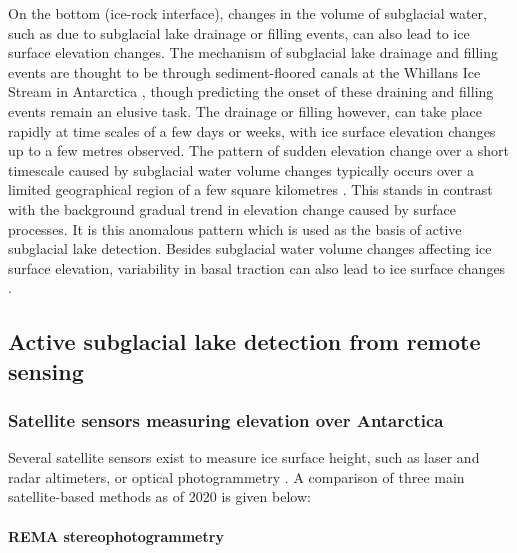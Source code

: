 On the bottom (ice-rock interface), changes in the volume of subglacial water, such as due to subglacial lake drainage or filling events, can also lead to ice surface elevation changes.
The mechanism of subglacial lake drainage and filling events are thought to be through sediment-floored canals at the Whillans Ice Stream in Antarctica \citep{CarterAntarcticsubglaciallakes2017}, though predicting the onset of these draining and filling events remain an elusive task.
The drainage or filling however, can take place rapidly at time scales of a few days or weeks, with ice surface elevation changes up to a few metres observed.
The pattern of sudden elevation change over a short timescale caused by subglacial water volume changes typically occurs over a limited geographical region of a few square kilometres \citep[e.g.][]{SiegfriedEpisodicicevelocity2016}. %
This stands in contrast with the background gradual trend in elevation change caused by surface processes.
It is this anomalous pattern which is used as the basis of active subglacial lake detection.
Besides subglacial water volume changes affecting ice surface elevation, variability in basal traction can also lead to ice surface changes \citep{GudmundssonTransmissionbasalvariability2003,Raymondrelationshipsurfacebasal2005,SergienkoCausessuddenshortterm2007}.



\subsection{Active subglacial lake detection from remote sensing} \label{sec:activesubglaciallakes}

\subsubsection{Satellite sensors measuring elevation over Antarctica}

Several satellite sensors exist to measure ice surface height, such as laser and radar altimeters, or optical photogrammetry \citep[see][for a review]{Frickerdecadeprogressobserving2016}.
A comparison of three main satellite-based methods as of 2020 is given below:

\paragraph{REMA stereophotogrammetry}

